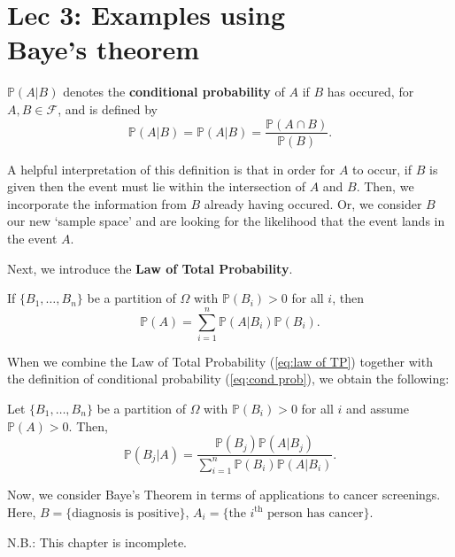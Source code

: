 \chapter[Lec 3: Examples using Baye's theorem]{Lec 3: Examples using\\Baye's theorem}


\begin{definition}\label{defn:cond prob}
    \(\mathbb{P}(A|B)\) denotes the \textbf{conditional probability} of \(A\) if \(B\) has occured, 
    for \(A,B \in \mathcal{F}\), and is defined by 
    \begin{equation}\label{eq:cond prob}
        \mathbb{P}(A|B) = \mathbb{P}(A|B) = \frac{\mathbb{P}(A\cap B)}{\mathbb{P}(B)}.
    \end{equation}
\end{definition}

A helpful interpretation of this definition is that in order for \(A\) to occur, if \(B\) is given then the event must 
lie within the intersection of \(A\) and \(B\). Then, we incorporate the information from \(B\) already having occured. 
Or, we consider \(B\) our new `sample space' and are looking for the likelihood that the event lands in the event \(A\). 

\bigskip

Next, we introduce the \textbf{Law of Total Probability}. 

\begin{theorem}\label{thm:law of TP}
    If \(\{B_1,\ldots,B_n\}\) be a partition of \(\Omega\) with \(\mathbb{P}(B_i)>0\) for all \(i\), then
    \begin{equation}\label{eq:law of TP}
        \mathbb{P}(A)= \sum_{i=1}^n \mathbb{P}(A|B_i)\mathbb{P}(B_i).
    \end{equation}
\end{theorem}

When we combine the Law of Total Probability (\cref{eq:law of TP}) together with the definition of conditional probability (\cref{eq:cond prob}), we obtain the following:

\begin{theorem}\label{thm:Baye's}
    Let \(\{B_1,\ldots,B_n\}\) be a partition of \(\Omega\) with \(\mathbb{P}(B_i)>0\) for all \(i\) and assume \(\mathbb{P}(A)>0\). Then, 
    \begin{equation}\label{eq:Baye's}
        \mathbb{P}(B_j|A) = \frac{\mathbb{P}(B_j)\mathbb{P}(A|B_j)}{\sum_{i=1}^n \mathbb{P}(B_i)\mathbb{P}(A|B_i)}.
    \end{equation}
\end{theorem}

Now, we consider Baye's Theorem in terms of applications to cancer screenings. 
Here, \(B = \{\text{diagnosis is positive}\}\), \(A_i = \{\text{the }i^{\text{th}} \text{ person has cancer}\}\). 

N.B.: This chapter is incomplete.